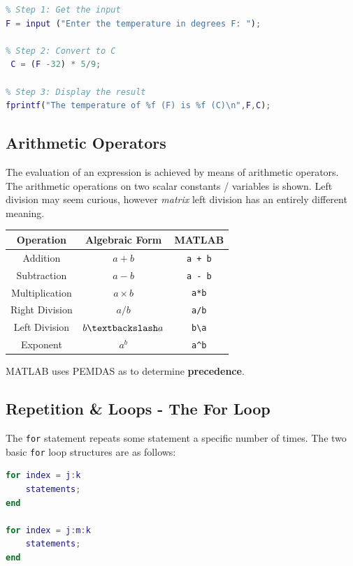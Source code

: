 \documentclass[11pt]{article}
\begin{document}
\begin{lstlisting}[language=MATLAB]
% Script file for converting temperatures from F to C. 
% Step 1: Get the input
F = input ("Enter the temperature in degrees F: ");

% Step 2: Convert to C 
 C = (F -32) * 5/9;

% Step 3: Display the result
fprintf("The temperature of %f (F) is %f (C)\n",F,C);
\end{lstlisting}

\subsection{Arithmetic Operators}
The evaluation of an expression is achieved by means of arithmetic operators. 
The arithmetic operations on two scalar constants / variables is shown. 
Left division may seem curious, however \textit{matrix} left division has an entirely different meaning. 

\begin{center}
\begin{tabular}{ |c|c|c| } 
    \hline
    \textbf{Operation} & \textbf{Algebraic Form} & \textbf{MATLAB} \\ 
    \hline
    Addition        & $ a + b $                 & \verb|a + b|  \\ 
    \hline
    Subtraction     & $ a - b $                 & \verb|a - b|  \\ 
    \hline
    Multiplication  & $ a \times b  $           & \verb|a*b|    \\
    \hline
    Right Division  & $ a/b $                   & \verb|a/b|    \\
    \hline
    Left Division   & $ b \textbackslash a $    & \verb|b\a|    \\
    \hline
    Exponent        & $ a^b $                   & \verb|a^b|    \\
    \hline
\end{tabular}
\end{center}

MATLAB uses PEMDAS as to determine \textbf{precedence}. 

\subsection{Repetition \& Loops - The For Loop}
The \verb|for| statement repeats some statement a specific number of times. 
The two basic \verb|for| loop structures are as follows:
\begin{lstlisting}[language=MATLAB]
for index = j:k 
    statements;
end 

for index = j:m:k 
    statements;
end
\end{lstlisting}
\end{document}
